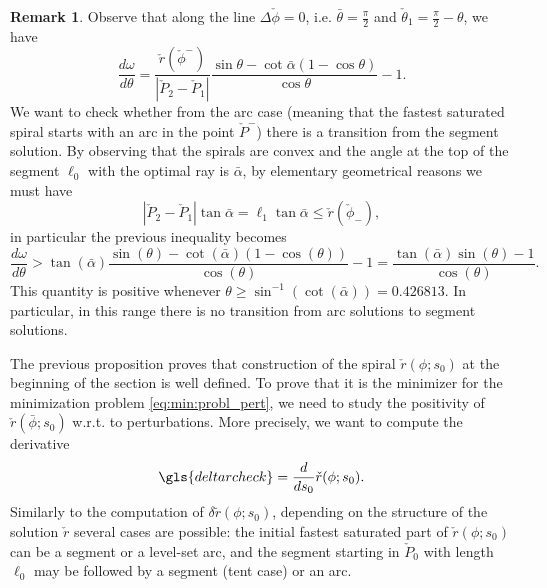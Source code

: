 \documentclass[reqno]{amsart}
\theoremstyle{definition} \newtheorem{definition}{Definition}[section]
\theoremstyle{definition} \newtheorem{remark}[definition]{Remark}
\theoremstyle{plain} \newtheorem{lemma}[definition]{Lemma}
\theoremstyle{plain} \newtheorem{proposition}[definition]{Proposition}
\theoremstyle{plain} \newtheorem{theorem}[definition]{Theorem}
\theoremstyle{plain} \newtheorem{corollary}[definition]{Corollary}
\theoremstyle{definition} \newtheorem{example}[definition]{Example}
\theoremstyle{plain} \newtheorem{claim}[clai]{Claim}
\theoremstyle{definition} \newtheorem{assumption}[definition]{Assumption}
\theoremstyle{definition} \newtheorem{observation}[definition]{Observation}
\newcommand{\1}{\mathbbm 1}
\numberwithin{equation}{section} %
\theoremstyle{plain} \newtheorem*{theorem*}{Theorem}
\theoremstyle{plain} \newtheorem{mthm}[maintheorem]{Main Theorem}
\theoremstyle{plain} \newtheorem*{mthm*}{Main Theorem}
\theoremstyle{plain} \newtheorem*{conjecture*}{Conjecture}
\theoremstyle{plain} \newtheorem{conjecture}[definition]{Conjecture}
\theoremstyle{plain} \newtheorem*{problem*}{Problem}
\begin{document}
\begin{remark}
\label{Rem:trans_segm_arc}
Observe that along the line $\Delta \check \phi = 0$, i.e. $\bar \theta = \frac{\pi}{2}$ and $\check \theta_1 = \frac{\pi}{2} - \theta$, we have
\begin{equation*}
\frac{d\omega}{d\theta} =\frac{\check r(\check\phi^-)}{|\check P_2-\check P_1|}\frac{\sin\theta-\cot\bar\alpha(1-\cos\theta)}{\cos\theta}-1.
\end{equation*}
We want to check whether from the arc case (meaning that the fastest saturated spiral starts with an arc in the point $\check P^-$) there is a transition from the segment solution.
By observing that the spirals are convex and the angle at the top of the segment $\ell_0$ with the optimal ray is $\bar \alpha$, by elementary geometrical reasons we must have 
\begin{equation*}
|\check P_2-\check P_1|\tan\bar\alpha=\ell_1\tan\bar\alpha\leq \check r(\check \phi_-),
\end{equation*}
in particular the previous inequality becomes %
\begin{equation*}
\frac{d\omega}{d\theta} > \tan(\bar\alpha)\frac{\sin(\theta)-\cot(\bar\alpha)(1-\cos(\theta))}{\cos(\theta)}-1 = \frac{\tan(\bar \alpha) \sin(\theta) - 1}{\cos(\theta)}.
\end{equation*}
This quantity is positive whenever $\theta\geq\sin^{-1}(\cot(\bar\alpha)) = 0.426813$. In particular, in this range there is no transition from arc solutions to segment solutions. 
\end{remark}

The previous proposition proves that construction of the spiral $\check r(\phi;s_0)$ at the beginning of the section is well defined. To prove that it is the minimizer for the minimization problem \eqref{eq:min:probl_pert}, we need to study the positivity of $\check r(\bar \phi;s_0)$ w.r.t. to perturbations. More precisely, we want to compute the derivative  
\begin{equation*}
\gls{deltarcheck} = \frac{d}{ds_0} \check r(\phi;s_0).
\end{equation*}
Similarly to the computation of $\delta \tilde r(\phi;s_0)$, depending on the structure of the solution $\check r$ several cases are possible: the initial fastest saturated part of $\check r(\phi;s_0)$ can be a segment or a level-set arc, and the segment starting in $\check P_0$ with length $\ell_0$ may be followed by a segment (tent case) or an arc.
\end{document}
